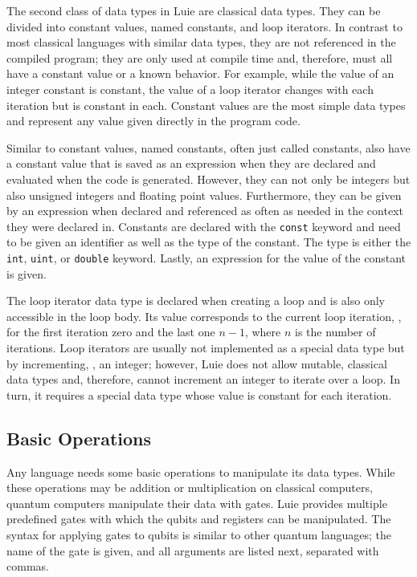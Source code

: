 The second class of data types in Luie are classical data types. They can be divided into constant values, named constants, and loop iterators. In contrast to most classical languages with similar data types, they are not referenced in the compiled program; they are only used at compile time and, therefore, must all have a constant value or a known behavior. For example, while the value of an integer constant is constant, the value of a loop iterator changes with each iteration but is constant in each.
Constant values are the most simple data types and represent any value given directly in the program code. 

Similar to constant values, named constants, often just called constants, also have a constant value that is saved as an expression when they are declared and evaluated when the code is generated. However, they can not only be integers but also unsigned integers and floating point values. Furthermore, they can be given by an expression when declared and referenced as often as needed in the context they were declared in. Constants are declared with the \texttt{const} keyword and need to be given an identifier as well as the type of the constant. The type is either the \texttt{int}, \texttt{uint}, or \texttt{double} keyword. Lastly, an expression for the value of the constant is given.

The loop iterator data type is declared when creating a loop and is also only accessible in the loop body. Its value corresponds to the current loop iteration, \eg, for the first iteration zero and the last one $n - 1$, where $n$ is the number of iterations. Loop iterators are usually not implemented as a special data type but by incrementing, \eg, an integer; however, Luie does not allow mutable, classical data types and, therefore, cannot increment an integer to iterate over a loop. In turn, it requires a special data type whose value is constant for each iteration.

\subsection{Basic Operations}
\label{sec:concept_basicOperations}
Any language needs some basic operations to manipulate its data types. While these operations may be addition or multiplication on classical computers, quantum computers manipulate their data with gates. Luie provides multiple predefined gates with which the qubits and registers can be manipulated. The syntax for applying gates to qubits is similar to other quantum languages; the name of the gate is given, and all arguments are listed next, separated with commas.

